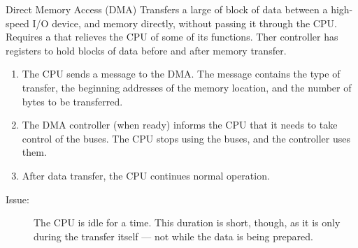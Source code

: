 \documentclass[../notes.tex]{subfiles}
\begin{document}
					\begin{definition}{Direct Memory Access (DMA)}
						Transfers a large of block of data between a high-speed I/O device, and memory directly, without passing it through the CPU. Requires a  that relieves the CPU of some of its functions. Ther controller has registers to hold blocks of data before and after memory transfer.
						\begin{enumerate}
							\item The CPU sends a message to the DMA. The message contains the type of transfer, the beginning addresses of the memory location, and the number of bytes to be transferred.
							\item The DMA controller (when ready) informs the CPU that it needs to take control of the buses. The CPU stops using the buses, and the controller uses them.
							\item After data transfer, the CPU continues normal operation.
						\end{enumerate}
						\begin{description}
							\item[Issue:] The CPU is idle for a time. This duration is short, though, as it is only during the transfer itself --- not while the data is being prepared.
						\end{description}
					\end{definition}
				\pagebreak
\end{document}

